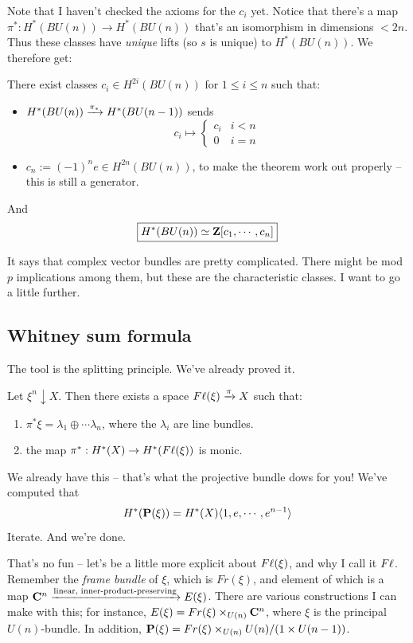 Note that I haven't checked the axioms for the $c_i$ yet.
Notice that there's a map $\pi^\ast:H^\ast(BU(n)) \to H^\ast(BU(n))$ that's an isomorphism in dimensions $<2n$.
Thus these classes have \emph{unique} lifts (so $s$ is unique) to $H^\ast(BU(n))$.
We therefore get:
\begin{theorem}
    There exist classes $c_i\in H^{2i}(BU(n))$ for $1\leq i\leq n$ such that:
    \begin{itemize}
	\item $H^\ast(BU(n)) \xrightarrow{{\pi_\ast}} H^\ast(BU(n-1))$ sends
	    $$
	    c_i \mapsto \begin{cases}
		c_i & i<n\\
		0 & i=n
	    \end{cases}
	    $$
	\item $c_n := (-1)^n e\in H^{2n}(BU(n))$, to make the theorem work out properly -- this is still a generator.
    \end{itemize}
    And
    $$
    \boxed{H^\ast(BU(n)) \simeq \mathbf Z[c_1,\cdots,c_n]}
    $$
\end{theorem}
It says that complex vector bundles are pretty complicated.
There might be mod $p$ implications among them, but these are the characteristic classes.
I want to go a little further.
\subsection{Whitney sum formula}
The tool is the splitting principle.
We've already proved it.
\begin{theorem}
    Let $\xi^n\downarrow X$.
    Then there exists a space $F\ell(\xi) \xrightarrow{{\pi}} X$ such that:
    \begin{enumerate}
	\item $\pi^\ast \xi = \lambda_1\oplus\cdots\lambda_n$, where the $\lambda_i$ are line bundles.
	\item the map $\pi^\ast: H^\ast(X) \to H^\ast(F\ell(\xi))$ is monic.
    \end{enumerate}
\end{theorem}
We already have this -- that's what the projective bundle dows for you!
We've computed that
$$
H^\ast(\mathbf P(\xi)) = H^\ast(X)\langle 1,e,\cdots,e^{n-1}\rangle
$$
Iterate.
And we're done.

That's no fun -- let's be a little more explicit about $F\ell(\xi)$, and why I call it $F\ell$.
Remember the \emph{frame bundle} of $\xi$, which is $Fr(\xi)$, and element of which is a map $\mathbf C^n\xrightarrow{{\text{linear, inner-product-preserving}}}E(\xi)$.
There are various constructions I can make with this; for instance, $E(\xi) = Fr(\xi)\times_{U(n)}\mathbf C^n$, where $\xi$ is the principal $U(n)$-bundle.
In addition, $\mathbf P(\xi) = Fr(\xi)\times_{U(n)} U(n)/(1\times U(n-1))$.


